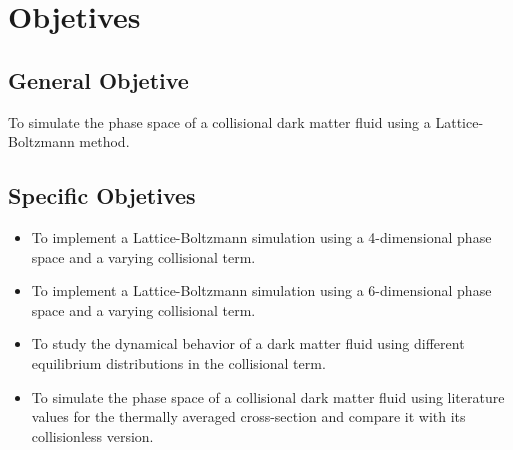 \chapter{Objetives}
\section{General Objetive}
To simulate the phase space of a collisional dark matter fluid using a Lattice-Boltzmann method.
\section{Specific Objetives}
\begin{itemize}
\item To implement a Lattice-Boltzmann simulation using a 4-dimensional phase space and a varying collisional term.
\item To implement a Lattice-Boltzmann simulation using a 6-dimensional phase space and a varying collisional term.
\item To study the dynamical behavior of a dark matter fluid using different equilibrium distributions in the collisional term.
\item To simulate the phase space of a collisional dark matter fluid using literature values for the thermally averaged cross-section and compare it with its collisionless version.
\end{itemize}